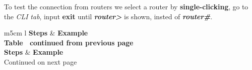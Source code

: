 \documentclass[11pt,a4paper]{report}
\begin{document}
        To test the connection from routers we select a router by \textbf{single-clicking}, go to the \textit{CLI tab}, input \textbf{exit} until \textbf{\textit{router>}} is shown, insted of \textbf{\textit{router\#}}. \\
        \begin{flushleft}
                \begin{center}
                    \begin{longtable}{ m{5cm} l }
                        \textbf{Steps} & \textbf{Example} \\
                        \hline
                        \endfirsthead
                        {{\bfseries Table \thetable\ continued from previous page}} \\
                        \textbf{Steps} & \textbf{Example} \\
                        \hline
                        \endhead
                        \hline Continued on next page \\
                        \endfoot
                        \endlastfoot


\end{longtable}
\end{center}
\end{flushleft}
\end{document}
